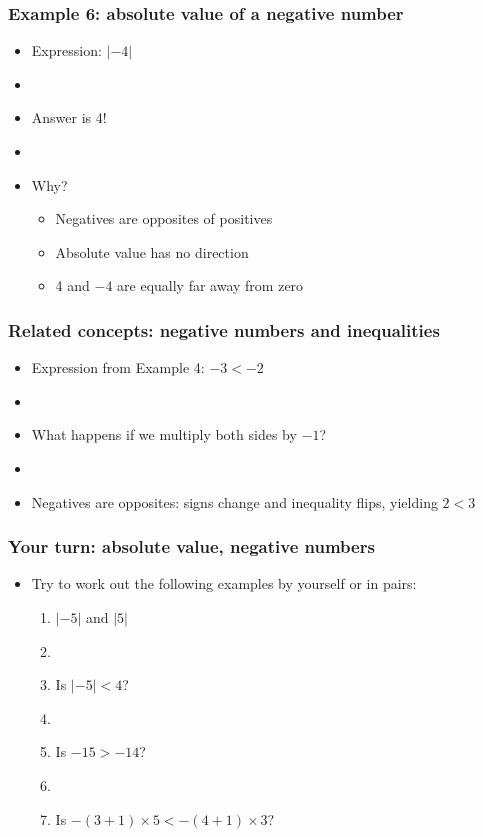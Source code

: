 \documentclass[12pt]{beamer}
\newcommand{\myframe}[1]{\begin{frame} \frametitle{#1}}
\begin{document}
\myframe{Example 6: absolute value of a negative number}
\begin{itemize}
\item Expression: $|-4|$
\item[]
\item Answer is 4!
\item[]
\item Why?
\begin{itemize}
\item Negatives are opposites of positives
\item Absolute value has no direction
\item 4 and $-4$ are equally far away from zero
\end{itemize}
\end{itemize}
\end{frame}

\myframe{Related concepts: negative numbers and inequalities}
\begin{itemize}
\item Expression from Example 4: $-3 < -2$
\item[]
\item What happens if we multiply both sides by $-1$?
\item[]
\item Negatives are opposites: signs change and inequality flips, yielding $2 < 3$
\end{itemize}
\end{frame}

\myframe{Your turn: absolute value, negative numbers}
\begin{itemize}
\item Try to work out the following examples by yourself or in pairs:
\begin{enumerate}
\item $|-5|$ and $|5|$
\item[]
\item Is $|-5| < 4$?
\item[]
\item Is $-15 > -14$? 
\item[]
\item Is $-(3 + 1)\times 5 < -(4 + 1)\times 3$?
\end{enumerate}
\end{itemize}
\end{frame}
\end{document}
